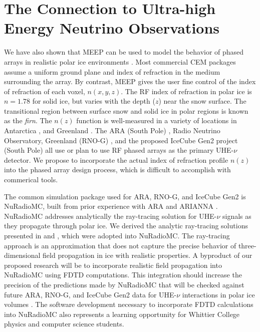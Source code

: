 \documentclass[../../main.tex]{subfiles}
\begin{document}
\section{The Connection to Ultra-high Energy Neutrino Observations}
\label{sec:askaryan}

We have also shown that MEEP can be used to model the behavior of phased arrays in realistic polar ice environments \cite{electronics10040415,meepcon2022,10.1016/j.cpc.2009.11.008}.  Most commercial CEM packages assume a uniform ground plane and index of refraction in the medium surrounding the array.  By contrast, MEEP gives the user fine control of the index of refraction of each voxel, $n(x,y,z)$.  The RF index of refraction in polar ice is $n = 1.78$ for solid ice, but varies with the depth ($z$) near the snow surface.  The transitional region between surface snow and solid ice in polar regions is known as the \textit{firn}.  The $n(z)$ function is well-measured in a variety of locations in Antarctica \cite{horizPaper}, and Greenland \cite{deaconu_2018}.  The ARA (South Pole) \cite{PhysRevD.105.122006}, Radio Neutrino Observatory, Greenland (RNO-G) \cite{rno}, and the proposed IceCube Gen2 project (South Pole) \cite{Aartsen_2021} all use or plan to use RF phased arrays as the primary UHE-$\nu$ detector.  We propose to incorporate the actual index of refraction profile $n(z)$ into the phased array design process, which is difficult to accomplish with commerical tools. \\ \vspace{2.5mm}

The common simulation package used for ARA, RNO-G, and IceCube Gen2 is NuRadioMC, built from prior experience with ARA and ARIANNA \cite{10.1140/epjc/s10052-020-7612-8,10.1109/tns.2015.2468182,10.1016/j.astropartphys.2011.11.010,Barwick:2014pca,10.1103/physrevd.102.043021}.  NuRadioMC addresses analytically the ray-tracing solution for UHE-$\nu$ signals as they propagate through polar ice.  We derived the analytic ray-tracing solutions presented in \cite{horizPaper} and \cite{10.1140/epjc/s10052-020-7612-8}, which were adopted into NuRadioMC.  The ray-tracing approach is an approximation that does not capture the precise behavior of three-dimensional field propagation in ice with realistic properties.  A byproduct of our proposed research will be to incorporate realistic field propagation into NuRadioMC using FDTD computations.  This integration should increase the precision of the predictions made by NuRadioMC that will be checked against future ARA, RNO-G, and IceCube Gen2 data for UHE-$\nu$ interactions in polar ice volumes \cite{10.22323/1.395.1217}.  The software development necessary to incorporate FDTD calculations into NuRadioMC also represents a learning opportunity for Whittier College physics and computer science students. \\ \vspace{2.5mm}
\end{document}
